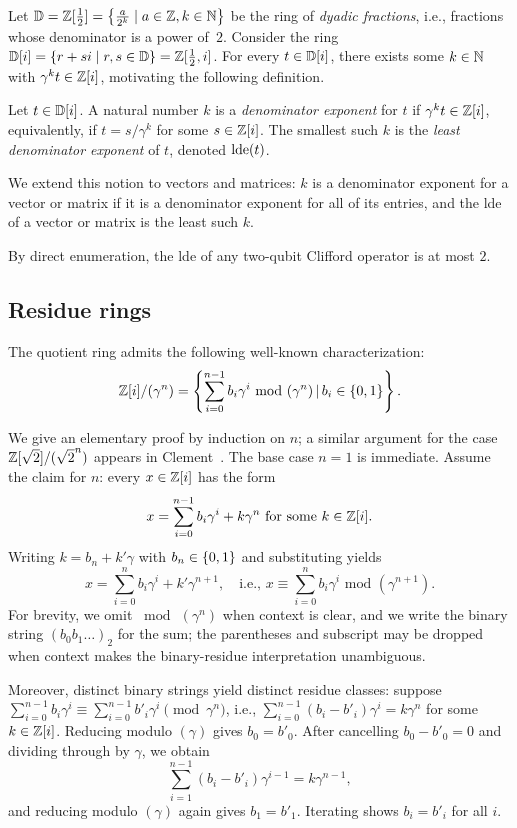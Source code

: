 \documentclass[reprint,amsmath,amssymb,aps,pra]{revtex4-2}
\begin{document}
Let ${\mathbb D}=\mathbb{Z}[\tfrac{1}{2}]=\left\{\tfrac{a}{2^k}\mid a\in\mathbb{Z}, k\in{\mathbb N}\right\}$ be the
ring of \emph{dyadic fractions}, i.e., fractions whose denominator is
a power of~$2$. Consider the ring
${\mathbb D}[i] = \left\{r+si \mid r, s \in {\mathbb D}\right\} = \mathbb{Z}[\tfrac{1}{2},i]$. For every
$t \in {\mathbb D} [i]$, there exists some $k \in {\mathbb N}$ with $\gamma^k t \in \mathbb{Z} [i]$,
motivating the following definition.

\begin{definition}
  Let $t \in {\mathbb D} [i]$. A natural number $k$ is a \emph{denominator
    exponent} for $t$ if $\gamma^k t \in \mathbb{Z} [i]$, equivalently, if
  $t = s/\gamma^k$ for some $s \in \mathbb{Z} [i]$. The smallest such $k$ is the
  \emph{least denominator exponent} of $t$, denoted $\operatorname{lde}(t)$.

  We extend this notion to vectors and matrices: $k$ is a denominator
  exponent for a vector or matrix if it is a denominator exponent for
  all of its entries, and the lde of a vector or matrix is the least
  such $k$.
\end{definition}

\begin{remark}
  By direct enumeration, the lde of any two-qubit Clifford operator is
  at most $2$.
\end{remark}

\subsection{Residue rings}

The quotient ring admits the following well-known characterization:
\[
  \mathbb{Z} [i]/(\gamma ^ n) = \left\{\sum_{i=0}^{n-1} b_i \gamma^i \text{ mod }
    (\gamma^n) \,|\, b_i \in \left\{0,1\right\} \right \}.
\]

We give an elementary proof by induction on $n$; a similar argument
for the case $\mathbb{Z}[\sqrt 2]/(\sqrt 2 ^ n)$ appears in
Clement~\cite{Clement_pri}. The base case $n=1$ is immediate. Assume
the claim for $n$: every $x \in \mathbb{Z} [i]$ has the form
\[
  x = \sum_{i=0}^{n-1} b_i \gamma^i + k \gamma^n \text{ for some } k
  \in \mathbb{Z} [i].
\]
Writing $k = b_n + k'\gamma$ with $b_n \in \left\{0,1\right\}$ and substituting
yields
\[
  x = \sum_{i=0}^{n} b_i \gamma^i + k' \gamma^{n+1}, \quad \text{i.e.,
  } x \equiv \sum_{i=0}^{n} b_i \gamma^i \text{ mod } (\gamma^{n+1}).
\]
For brevity, we omit $\bmod\,(\gamma^n)$ when context is clear, and we
write the binary string $(b_0 b_1 \dots)_2$ for the sum; the
parentheses and subscript may be dropped when context makes the
binary-residue interpretation unambiguous.

Moreover, distinct binary strings yield distinct residue classes:
suppose $\sum_{i=0}^{n-1} b_i \gamma^i \equiv \sum_{i=0}^{n-1} b'_i
\gamma^i \pmod{\gamma^n}$, i.e., $\sum_{i=0}^{n-1} (b_i - b'_i)
\gamma^i = k\gamma^n$ for some $k \in \mathbb{Z} [i]$. Reducing modulo
$(\gamma)$ gives $b_0 = b'_0$. After cancelling $b_0 - b'_0 = 0$ and
dividing through by $\gamma$, we obtain
\[
  \sum_{i=1}^{n-1} (b_i - b'_i) \gamma^{i-1} = k\gamma^{n-1},
\]
and reducing modulo $(\gamma)$ again gives $b_1 = b'_1$. Iterating
shows $b_i = b'_i$ for all $i$.
\end{document}
